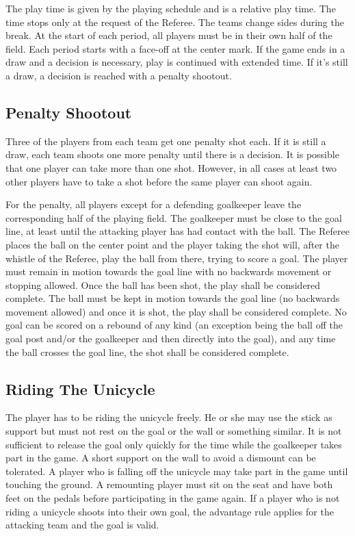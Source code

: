 The play time is given by the playing schedule and is a relative play time.
The time stops only at the request of the Referee.
The teams change sides during the break.
At the start of each period, all players must be in their own half of the field.
Each period starts with a face-off at the center mark.
If the game ends in a draw and a decision is necessary, play is continued with extended time.
If it's still a draw, a decision is reached with a penalty shootout.

\subsection{Penalty Shootout}
Three of the players from each team get one penalty shot each.
If it is still a draw, each team shoots one more penalty until there is a decision.
It is possible that one player can take more than one shot.
However, in all cases at least two other players have to take a shot before the same player can shoot again.

For the penalty, all players except for a defending goalkeeper leave the corresponding half of the playing field.
The goalkeeper must be close to the goal line, at least until the attacking player has had contact with the ball.
The Referee places the ball on the center point and the player taking the shot will, after the whistle of the Referee, play the ball from there, trying to score a goal.
The player must remain in motion towards the goal line with no backwards movement or stopping allowed.
Once the ball has been shot, the play shall be considered complete.
The ball must be kept in motion towards the goal line (no backwards movement allowed) and once it is shot, the play shall be considered complete.
No goal can be scored on a rebound of any kind (an exception being the ball off the goal post and/or the goalkeeper and then directly into the goal), and any time the ball crosses the goal line, the shot shall be considered complete.

\subsection{Riding The Unicycle}
The player has to be riding the unicycle freely.
He or she may use the stick as support but must not rest on the goal or the wall or something similar.
It is not sufficient to release the goal only quickly for the time while the goalkeeper takes part in the game.
A short support on the wall to avoid a dismount can be tolerated.
A player who is falling off the unicycle may take part in the game until touching the ground.
A remounting player must sit on the seat and have both feet on the pedals before participating in the game again.
If a player who is not riding a unicycle shoots into their own goal, the advantage rule applies for the attacking team and the goal is valid.


